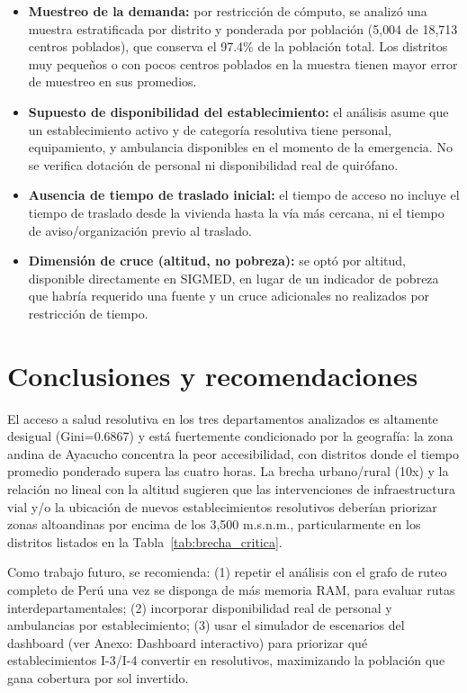 \documentclass[11pt,a4paper]{article}
\begin{document}
\begin{itemize}
  \item \textbf{Muestreo de la demanda:} por restricción de cómputo, se
  analizó una muestra estratificada por distrito y ponderada por población
  (5{,}004 de 18{,}713 centros poblados), que conserva el 97.4\% de la
  población total. Los distritos muy pequeños o con pocos centros poblados en
  la muestra tienen mayor error de muestreo en sus promedios.

  \item \textbf{Supuesto de disponibilidad del establecimiento:} el análisis
  asume que un establecimiento activo y de categoría resolutiva tiene personal,
  equipamiento, y ambulancia disponibles en el momento de la emergencia. No se
  verifica dotación de personal ni disponibilidad real de quirófano.

  \item \textbf{Ausencia de tiempo de traslado inicial:} el tiempo de acceso
  no incluye el tiempo de traslado desde la vivienda hasta la vía más cercana,
  ni el tiempo de aviso/organización previo al traslado.

  \item \textbf{Dimensión de cruce (altitud, no pobreza):} se optó por altitud,
  disponible directamente en SIGMED, en lugar de un indicador de pobreza que
  habría requerido una fuente y un cruce adicionales no realizados por
  restricción de tiempo.
\end{itemize}

\section{Conclusiones y recomendaciones}

El acceso a salud resolutiva en los tres departamentos analizados es altamente
desigual (Gini=0.6867) y está fuertemente condicionado por la geografía: la
zona andina de Ayacucho concentra la peor accesibilidad, con distritos donde el
tiempo promedio ponderado supera las cuatro horas. La brecha urbano/rural
(10x) y la relación no lineal con la altitud sugieren que las intervenciones de
infraestructura vial y/o la ubicación de nuevos establecimientos resolutivos
deberían priorizar zonas altoandinas por encima de los 3{,}500 m.s.n.m.,
particularmente en los distritos listados en la Tabla~\ref{tab:brecha_critica}.

Como trabajo futuro, se recomienda: (1) repetir el análisis con el grafo de
ruteo completo de Perú una vez se disponga de más memoria RAM, para evaluar
rutas interdepartamentales; (2) incorporar disponibilidad real de personal y
ambulancias por establecimiento; (3) usar el simulador de escenarios del
dashboard (ver Anexo: Dashboard interactivo) para priorizar qué establecimientos
I-3/I-4 convertir en resolutivos, maximizando la población que gana cobertura
por sol invertido.
\end{document}
